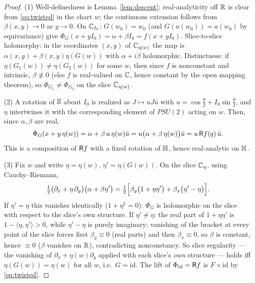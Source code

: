 \documentclass[11pt]{amsart}
\theoremstyle{definition}
\theoremstyle{remark}
\begin{document}
\begin{proof}
(1) Well-definedness is Lemma~\ref{lem:descent}; real-analyticity off
$\mathbb{R}$ is clear from \eqref{eq:twisted} in the chart $w$; the continuous
extension follows from $\beta(x,y)\to0$ as $y\to0$.  On $\mathbb{C}_{I_0}$:
$G(w_0)=w_0$ (and $G(a(w_0))=a(w_0)$ by equivariance) give
$\Phi_G(x+yI_0)=\alpha+\beta I_0=f(x+yI_0)$.  Slice-to-slice holomorphy:
in the coordinates $(x,y)$ of $\mathbb{C}_{\eta(w)}$ the map is
$\alpha(x,y)+\beta(x,y)\eta(G(w))$ with $\alpha+i\beta$ holomorphic.
Distinctness: if $\eta(G_1(w))\neq\eta(G_2(w))$ for some $w$, then since
$f$ is nonconstant and intrinsic, $\beta\not\equiv0$ (else $f$ is
real-valued on $\mathbb{C}$, hence constant by the open mapping theorem), so
$\Phi_{G_1}\neq\Phi_{G_2}$ on the slice $\mathbb{C}_{\eta(w)}$.

(2) A rotation of $\mathbb{S}$ about $I_0$ is realized as $J\mapsto uJ\bar u$
with $u=\cos\tfrac\theta2+I_0\sin\tfrac\theta2$, and $\eta$ intertwines
it with the corresponding element of $PSU(2)$ acting on $w$.  Then, since
$\alpha,\beta$ are real,
\[
\Phi_G(x+y\,\eta(w))=\alpha+\beta\,u\,\eta(w)\bar u
=u\bigl(\alpha+\beta\,\eta(w)\bigr)\bar u
=u\,\mathsf{R} f(q)\,\bar u .
\]
This is a composition of $\mathsf{R} f$ with a fixed rotation of $\mathbb{H}$, hence
real-analytic on $\mathbb{H}$.

(3) Fix $w$ and write $\eta=\eta(w)$, $\eta'=\eta(G(w))$.  On the slice
$\mathbb{C}_\eta$, using Cauchy--Riemann,
\[
\tfrac12\bigl(\partial_x+\eta\,\partial_y\bigr)
\bigl(\alpha+\beta\eta'\bigr)
=\tfrac12\Bigl[\beta_y\bigl(1+\eta\eta'\bigr)
+\beta_x\bigl(\eta'-\eta\bigr)\Bigr].
\]
If $\eta'=\eta$ this vanishes identically ($1+\eta^2=0$): $\Phi_G$ is
holomorphic on the slice with respect to the slice's own structure.  If
$\eta'\neq\eta$: the real part of $1+\eta\eta'$ is
$1-\langle\eta,\eta'\rangle>0$, while $\eta'-\eta$ is purely imaginary;
vanishing of the bracket at every point of the slice forces first
$\beta_y\equiv0$ (real parts) and then $\beta_x\equiv0$, so $\beta$ is
constant, hence $\equiv0$ ($\beta$ vanishes on $\mathbb{R}$), contradicting
nonconstancy.  So slice regularity --- the vanishing of
$\partial_x+\eta(w)\partial_y$ applied with each slice's \emph{own}
structure --- holds iff $\eta(G(w))=\eta(w)$ for all $w$, i.e.\
$G=\mathrm{id}$.  The lift of $\Phi_{\mathrm{id}}=\mathsf{R} f$ is
$F\times\mathrm{id}$ by \eqref{eq:twisted}.
\end{proof}
\end{document}

